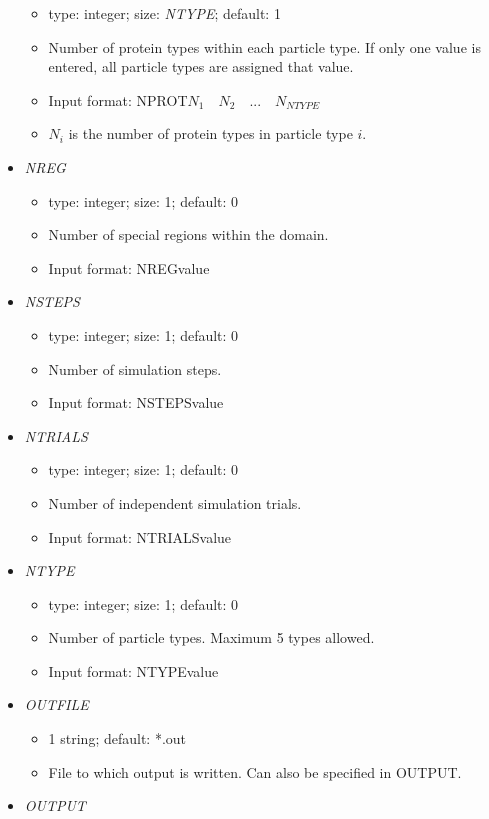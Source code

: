 \documentclass[12pt]{article}
\begin{document}
\begin{itemize}
\begin{itemize}
		\item  type: integer; size: \textit{NTYPE}; default: 1
		\item Number of protein types within each particle type. If only one value is entered, all particle types are assigned that value.
		\item Input format: NPROT\quad$N_{1}\quad N_{2}\quad...\quad N_{NTYPE}$
		\item $N_{i}$ is the number of protein types in particle type $i$.
	\end{itemize}
%
\item {\it NREG}
\begin{itemize}
	\item  type: integer; size: 1; default: 0
	\item Number of special regions within the domain.
	\item Input format: NREG\quad value
\end{itemize} 
%
\item {\it NSTEPS}
\begin{itemize}
	\item  type: integer; size: 1; default: 0
	\item Number of simulation steps.
	\item Input format: NSTEPS\quad value
\end{itemize} 
%
\item {\it NTRIALS}
\begin{itemize}
	\item  type: integer; size: 1; default: 0
	\item Number of independent simulation trials.
	\item Input format: NTRIALS\quad value
\end{itemize} 
%
\item {\it NTYPE}
\begin{itemize}
	\item  type: integer; size: 1; default: 0
	\item Number of particle types. Maximum 5 types allowed.
	\item Input format: NTYPE\quad value
\end{itemize}
%
\item {\it OUTFILE}
	\begin{itemize}
		\item 1 string; default: *.out
		\item File to which output is written. Can also be specified in OUTPUT.
	\end{itemize} 
%
\item {\it OUTPUT}

\end{itemize}
\end{document}
